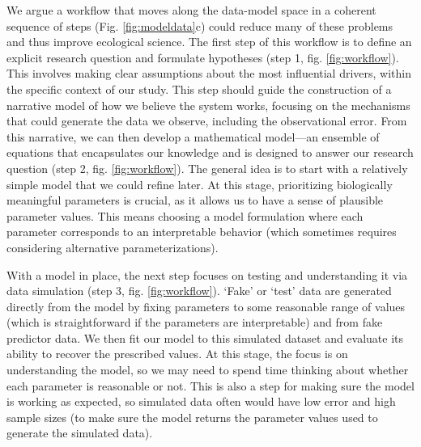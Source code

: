 \documentclass[11pt]{article}
\begin{document}
We argue a workflow that moves along the data-model space in a coherent sequence of steps %
(Fig. \ref{fig:modeldata}c) could reduce many of these problems and thus improve ecological science.
The first step of this workflow is to define an explicit research question and formulate hypotheses (step 1, fig. \ref{fig:workflow}). This involves making clear assumptions about the most influential drivers, within the specific context of our study. This step should guide the construction of a narrative model of how we believe the system works, focusing on the mechanisms that could generate the data we observe, including the observational error. %
From this narrative, we can then develop a mathematical model---an ensemble of equations that encapsulates our knowledge and is designed to answer our research question (step 2, fig. \ref{fig:workflow}). The general idea is to start with a relatively simple model that we could refine later. At this stage, prioritizing biologically meaningful parameters is crucial, as it allows us to have a sense of plausible parameter values. This means choosing a model formulation where each parameter corresponds to an interpretable behavior (which sometimes requires considering alternative parameterizations).

With a model in place, the next step focuses on testing and understanding it via data simulation (step 3, fig. \ref{fig:workflow}). `Fake' or `test' data are generated directly from the model by fixing parameters to some reasonable range of values (which is straightforward if the parameters are interpretable) and from fake predictor data. %
We then fit our model to this simulated dataset and evaluate its ability to recover the prescribed values. At this stage, the focus is on understanding the model, so we may need to spend time thinking about whether each parameter is reasonable or not. This is also a step for making sure the model is working as expected, so simulated data often would have low error and high sample sizes (to make sure the model returns the parameter values used to generate the simulated data). %
\end{document}

